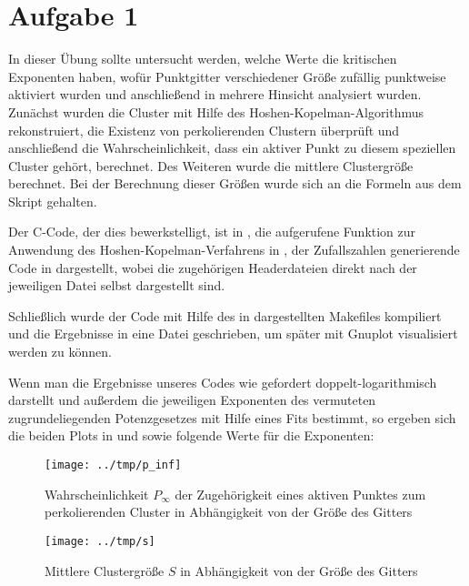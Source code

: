 \section*{Aufgabe 1}
In dieser Übung sollte untersucht werden, welche Werte die kritischen Exponenten
haben, wofür Punktgitter verschiedener Größe zufällig punktweise aktiviert wurden
und anschließend in mehrere Hinsicht analysiert wurden. Zunächst wurden die Cluster
mit Hilfe des Hoshen-Kopelman-Algorithmus rekonstruiert, die Existenz
von perkolierenden Clustern überprüft und anschließend die Wahrscheinlichkeit, dass
ein aktiver Punkt zu diesem speziellen Cluster gehört, berechnet. Des Weiteren
wurde die mittlere Clustergröße berechnet. Bei der Berechnung dieser Größen wurde
sich an die Formeln aus dem Skript gehalten.

Der C-Code, der dies bewerkstelligt, ist in , die aufgerufene
Funktion zur Anwendung des Hoshen-Kopelman-Verfahrens in , der Zufallszahlen
generierende Code in  dargestellt, wobei die zugehörigen Headerdateien 
direkt nach der jeweiligen Datei selbst dargestellt sind.







Schließlich wurde der Code mit Hilfe des in  dargestellten Makefiles
kompiliert und die Ergebnisse in eine Datei geschrieben, um später mit Gnuplot
visualisiert werden zu können.



Wenn man die Ergebnisse unseres Codes wie gefordert doppelt-logarithmisch darstellt
und außerdem die jeweiligen Exponenten des vermuteten zugrundeliegenden Potenzgesetzes
mit Hilfe eines Fits bestimmt, so ergeben sich die beiden Plots in  und
 sowie folgende Werte für die Exponenten:

\begin{figure}[htb]
  \centering
  \texttt{[image: ../tmp/p\_inf]}
  \caption{Wahrscheinlichkeit $P_{\infty}$ der Zugehörigkeit eines aktiven Punktes zum perkolierenden Cluster in Abhängigkeit von der Größe des Gitters}
  \label{fig:P}
\end{figure}

\begin{figure}[htb]
  \centering
  \texttt{[image: ../tmp/s]}
  \caption{Mittlere Clustergröße $S$ in Abhängigkeit von der Größe des Gitters}
  \label{fig:S}
\end{figure}